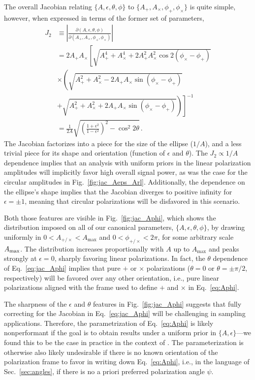 \documentclass[aps,prd,twocolumn,superscriptaddress,preprintnumbers,floatfix,nofootinbib]{revtex4-2}
\newcommand*{\eq}[1]{Eq.~\eqref{eq:#1}}
\begin{document}
The overall Jacobian relating $\{A, \epsilon, \theta, \phi\}$ to $\{A_+, A_\times, \phi_+, \phi_\times\}$ is quite simple, however, when expressed in terms of the former set of parameters,
\begin{subequations} \label{eq:jac_Aphi}
\begin{align}
J_2 &\equiv \left| \frac{\partial(A, \epsilon, \theta, \phi)}{\partial(A_+, A_\times, \phi_+, \phi_\times)}\right| \nonumber \\
&= 2 A_+ A_\times \left[ \sqrt{A_+^4 + A_\times^4 + 2 A_+^2 A_\times^2 \cos 2(\phi_\times - \phi_+)} \right. \nonumber \\
& \times \left( \sqrt{A_+^2 + A_\times^2 -2 A_+ A_\times \sin(\phi_\times-\phi_+)} \right. \nonumber \\
&\left.\left. +  \sqrt{A_+^2 + A_\times^2 +2 A_+ A_\times \sin(\phi_\times-\phi_+)}\right)\right]^{-1}\\
&= \frac{1}{2 A} \sqrt{\left(\frac{1 + \epsilon^2}{1 - \epsilon^2}\right)^2 - \cos^2 2\theta} \, .
\end{align}
\end{subequations}
The Jacobian factorizes into a piece for the size of the ellipse ($1/A$), and a less trivial piece for its shape and orientation (function of $\epsilon$ and $\theta$).
The $J_2 \propto 1/A$ dependence implies that an analysis with uniform priors in the linear polarization amplitudes will implicitly favor high overall signal power, as was the case for the circular amplitudes in Fig.~\ref{fig:jac_Aeps_Arl}.
Additionally, the dependence on the ellipse's shape implies that the Jacobian diverges to positive infinity for $\epsilon = \pm 1$, meaning that circular polarizations will be disfavored in this scenario.

Both those features are visible in Fig.~\ref{fig:jac_Aphi}, which shows the distribution imposed on all of our canonical parameters, $\{A,\epsilon, \theta, \phi\}$, by drawing uniformly in $0 < A_{+/\times} < A_{\max}$ and $0 < \phi_{+/\times} < 2\pi$, for some arbitrary scale $A_{\rm max}$.
The distribution increases proportionally with $A$ up to $A_{\max}$ and peaks strongly at $\epsilon = 0$, sharply favoring linear polarizations.
In fact, the $\theta$ dependence of \eq{jac_Aphi} implies that pure $+$ or $\times$ polarizations ($\theta=0$ or $\theta = \pm\pi/2$, respectively) will be favored over any other orientation, i.e., pure linear polarizations aligned with the frame used to define $+$ and $\times$ in \eq{Aphi}.

The sharpness of the $\epsilon$ and $\theta$ features in Fig.~\ref{fig:jac_Aphi} suggests that fully correcting for the Jacobian in \eq{jac_Aphi} will be challenging in sampling applications.
Therefore, the parametrization of \eq{Aphi} is likely nonperformant if the goal is to obtain results under a uniform prior in $\{A,\epsilon\}$---we found this to be the case in practice in the context of \cite{Chatziioannou:2021mij}.
The parameterization is otherwise also likely undesirable if there is no known orientation of the polarization frame to favor in writing down \eq{Aphi}, i.e., in the language of Sec.~\ref{sec:angles}, if there is no a priori preferred polarization angle $\psi$.
\end{document}
